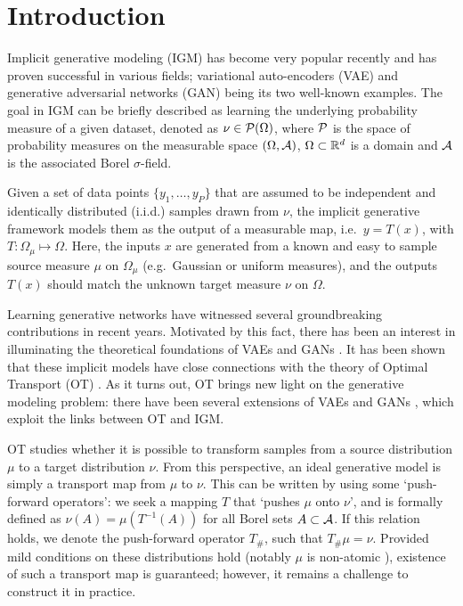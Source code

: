 
\section{Introduction}


Implicit generative modeling (IGM) \cite{diggle1984monte, mohamed2016learning} has become very popular recently and has proven
successful in various fields; variational auto-encoders (VAE) \cite{kingma2013VAE} and generative adversarial networks (GAN) \cite{goodfellow2014generative} being its two well-known examples. The goal in IGM can be briefly described as learning the
underlying probability measure of a given dataset, denoted as $\nu \in {\cal P}(\Omega)$, where ${\cal P}$ is the space of probability measures on the measurable space $(\Omega,\mathcal{A})$, $\Omega \subset \mathbb{R}^d$ is a domain and $\mathcal{A}$ is the associated Borel $\sigma$-field.

Given a set of data points $\{y_1 , \dots , y_P \}$ that are assumed to be independent and identically distributed (i.i.d.) samples drawn from $\nu$, the implicit generative framework models them as the output of a measurable map, i.e.\ $y = T(x)$, with $T: \Omega_\mu \mapsto \Omega$. Here, the inputs $x$ are generated from a known and easy to sample source measure $\mu$ on $\Omega_\mu$ (e.g.\ Gaussian or uniform measures), and the outputs $T(x)$ should match the unknown target measure $\nu$ on $\Omega$.




Learning generative networks have witnessed several groundbreaking contributions in recent years. Motivated by this fact, there has been an interest in illuminating the theoretical foundations of VAEs and GANs \cite{bousquet2017optimal,liu2017approximation}.
%
It has been shown that these implicit models have close connections with the theory of Optimal Transport (OT) \cite{villani2008optimal}.
%
As it turns out, OT brings new light on the generative modeling problem: there have been several extensions of VAEs \cite{tolstikhin2017wasserstein,kolouri2018sliced} and GANs \cite{arjovsky2017wasserstein,gulrajani2017improved,guo2017relaxed,lei2017geometric}, which exploit the links between OT and IGM.


OT studies whether it is possible to transform samples from a source distribution $\mu$ to a target distribution $\nu$. From this perspective, an ideal generative model is simply a transport map from $\mu$ to $\nu$.
This can be written by using some `push-forward operators': we seek a mapping $T$ that `pushes $\mu$ onto $\nu$', and is formally defined as $ \nu(A) =  \mu(T^{-1}(A)) $ for all Borel sets $A \subset \mathcal{A}$. If this relation holds, we denote the push-forward operator $T_\#$, such that $T_\# \mu = \nu$. Provided mild conditions on these distributions hold (notably $\mu$ is non-atomic \cite{villani2008optimal}), existence of such a transport map is guaranteed; however, it remains a challenge to construct it in practice.

